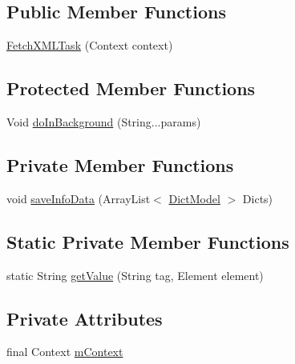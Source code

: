 \subsection*{Public Member Functions}
\begin{DoxyCompactItemize}
\item 
\hyperlink{classorg_1_1buildmlearn_1_1toolkit_1_1dictationtemplate_1_1data_1_1FetchXMLTask_a3417c1753482f54e49de416a5c55dbd4}{Fetch\+X\+M\+L\+Task} (Context context)
\end{DoxyCompactItemize}
\subsection*{Protected Member Functions}
\begin{DoxyCompactItemize}
\item 
Void \hyperlink{classorg_1_1buildmlearn_1_1toolkit_1_1dictationtemplate_1_1data_1_1FetchXMLTask_a8e2124fd4492361e2e58a3396aa94438}{do\+In\+Background} (String...\+params)
\end{DoxyCompactItemize}
\subsection*{Private Member Functions}
\begin{DoxyCompactItemize}
\item 
void \hyperlink{classorg_1_1buildmlearn_1_1toolkit_1_1dictationtemplate_1_1data_1_1FetchXMLTask_afddbf8ae11c166ed8645e329e6f84741}{save\+Info\+Data} (Array\+List$<$ \hyperlink{classorg_1_1buildmlearn_1_1toolkit_1_1dictationtemplate_1_1data_1_1DictModel}{Dict\+Model} $>$ Dicts)
\end{DoxyCompactItemize}
\subsection*{Static Private Member Functions}
\begin{DoxyCompactItemize}
\item 
static String \hyperlink{classorg_1_1buildmlearn_1_1toolkit_1_1dictationtemplate_1_1data_1_1FetchXMLTask_a92cf49d8d9974865dc0e974f9647d7ca}{get\+Value} (String tag, Element element)
\end{DoxyCompactItemize}
\subsection*{Private Attributes}
\begin{DoxyCompactItemize}
\item 
final Context \hyperlink{classorg_1_1buildmlearn_1_1toolkit_1_1dictationtemplate_1_1data_1_1FetchXMLTask_a9919d5e399db7b998be7d2dc954acf7d}{m\+Context}
\end{DoxyCompactItemize}


